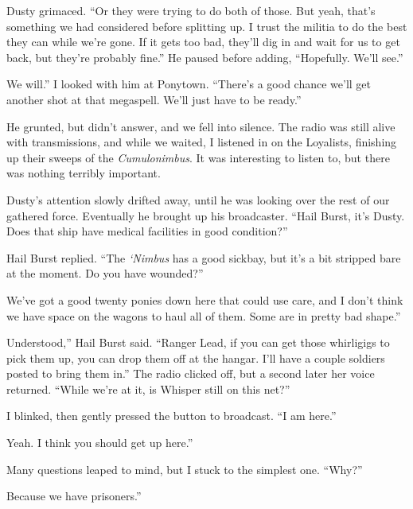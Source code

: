 Dusty grimaced. “Or they were trying to do both of those. But yeah, that’s something we had considered before splitting up. I trust the militia to do the best they can while we’re gone. If it gets too bad, they’ll dig in and wait for us to get back, but they’re probably fine.” He paused before adding, “Hopefully. We’ll see.”

\leavevmode{}We will.” I looked with him at Ponytown. “There’s a good chance we’ll get another shot at that megaspell. We’ll just have to be ready.”

He grunted, but didn’t answer, and we fell into silence. The radio was still alive with transmissions, and while we waited, I listened in on the Loyalists, finishing up their sweeps of the \textit{Cumulonimbus}. It was interesting to listen to, but there was nothing terribly important.

Dusty’s attention slowly drifted away, until he was looking over the rest of our gathered force. Eventually he brought up his broadcaster. “Hail Burst, it’s Dusty. Does that ship have medical facilities in good condition?”

Hail Burst replied. “The \textit{‘Nimbus} has a good sickbay, but it’s a bit stripped bare at the moment. Do you have wounded?”

\leavevmode{}We’ve got a good twenty ponies down here that could use care, and I don’t think we have space on the wagons to haul all of them. Some are in pretty bad shape.”

\leavevmode{}Understood,” Hail Burst said. “Ranger Lead, if you can get those whirligigs to pick them up, you can drop them off at the hangar. I’ll have a couple soldiers posted to bring them in.” The radio clicked off, but a second later her voice returned. “While we’re at it, is Whisper still on this net?”

I blinked, then gently pressed the button to broadcast. “I am here.”

\leavevmode{}Yeah. I think you should get up here.”

Many questions leaped to mind, but I stuck to the simplest one. “Why?”

\leavevmode{}Because we have prisoners.”